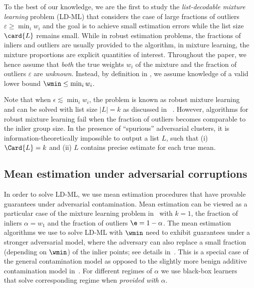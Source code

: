 To the best of our knowledge, we are the first to study the \emph{list-decodable mixture learning} problem (LD-ML)
that considers the case of large fractions of outliers \(\varepsilon \geq \min_{i} w_i\) and the goal is to achieve small estimation errors while the %
list size \(\card{L}\) remains small.
While in robust estimation problems, the fractions of inliers and outliers are usually provided to the algorithm, in  mixture learning, 
the mixture proportions are explicit quantities of interest.
Throughout the paper, we hence assume that \emph{both} the true weights \(w_i\)  of the mixture and the fraction of outliers \(\varepsilon\) are \emph{unknown}. Instead, by definition in , we assume knowledge of %
a valid lower bound $\wmin\leq \min_{i} w_i$. 

Note that when \(\epsilon \lesssim \min_i w_i\), the problem is known as robust mixture learning and can be solved with list size $|L|=k$ as discussed in ~\cite{diakonikolas2018list, bakshi2022robustly, ivkov2022list}.
However, algorithms for robust mixture learning fail when the fraction of outliers becomes comparable to the inlier group size. 
In the presence of ``spurious'' adversarial clusters, it is information-theoretically impossible to output a list \(L\), such that (i) \(\Card{L} = k\) and (ii) \(L\) contains precise estimate for each true mean.

\subsection{Mean estimation under adversarial corruptions}
\label{sec:list-decodable}

In order to solve LD-ML, we use mean estimation procedures that have provable guarantees under adversarial contamination. Mean estimation can be viewed as a particular case of the mixture learning problem in~ with \(k = 1\), the fraction of inliers \(\alpha = w_1\) and the fraction of outliers \(\e = 1 - \alpha\).
The mean estimation algorithms we use to solve LD-ML with $\wmin$ need to exhibit guarantees under a stronger adversarial model, where the adversary can also replace a small fraction (depending on \(\wmin\)) of the inlier points; see details in~. This is a special case of the general contamination model as opposed to the slightly more benign additive contamination model in~. For different regimes of $\alpha$ we use black-box learners that solve corresponding regime when \emph{provided with} \(\alpha\).

